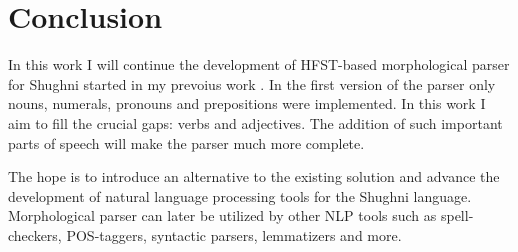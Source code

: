\section{Conclusion}

\par In this work I will continue the development of HFST-based morphological parser for Shughni started in my prevoius work \parencite{osorgin_2024_twol}. In the first version of the parser only nouns, numerals, pronouns and prepositions were implemented. In this work I aim to fill the crucial gaps: verbs and adjectives. The addition of such important parts of speech will make the parser much more complete.
\par The hope is to introduce an alternative to the existing solution and advance the development of natural language processing tools for the Shughni language. Morphological parser can later be utilized by other NLP tools such as spell-checkers, POS-taggers, syntactic parsers, lemmatizers and more.
